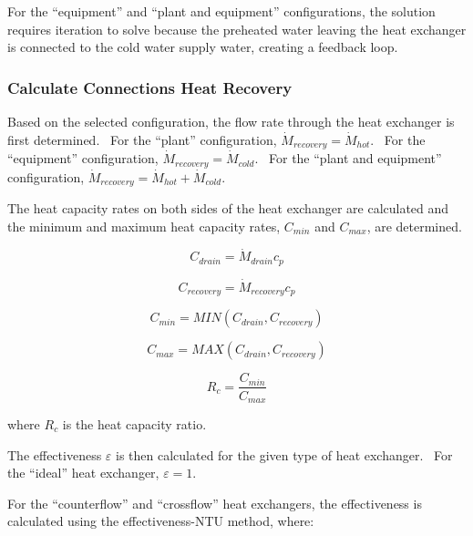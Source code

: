 For the ``equipment'' and ``plant and equipment'' configurations, the solution requires iteration to solve because the preheated water leaving the heat exchanger is connected to the cold water supply water, creating a feedback loop.

\subsubsection{Calculate Connections Heat Recovery}\label{calculate-connections-heat-recovery}

Based on the selected configuration, the flow rate through the heat exchanger is first determined.~ For the ``plant'' configuration, \({\dot M_{recovery}} = {\dot M_{hot}}\).~ For the ``equipment'' configuration, \({\dot M_{recovery}} = {\dot M_{cold}}\).~ For the ``plant and equipment'' configuration, \({\dot M_{recovery}} = {\dot M_{hot}} + {\dot M_{cold}}\).

The heat capacity rates on both sides of the heat exchanger are calculated and the minimum and maximum heat capacity rates, \({C_{min}}\) and \({C_{max}}\), are determined.

\begin{equation}
{C_{drain}} = {\dot M_{drain}}{c_p}
\end{equation}

\begin{equation}
{C_{recovery}} = {\dot M_{recovery}}{c_p}
\end{equation}

\begin{equation}
{C_{min}} = MIN({C_{drain}},{C_{recovery}})
\end{equation}

\begin{equation}
{C_{max}} = MAX({C_{drain}},{C_{recovery}})
\end{equation}

\begin{equation}
{R_c} = \frac{{{C_{min}}}}{{{C_{max}}}}
\end{equation}

where \({R_c}\) is the heat capacity ratio.

The effectiveness \(\varepsilon\) is then calculated for the given type of heat exchanger.~ For the ``ideal'' heat exchanger, \(\varepsilon = 1\).

For the ``counterflow'' and ``crossflow'' heat exchangers, the effectiveness is calculated using the effectiveness-NTU method, where:

